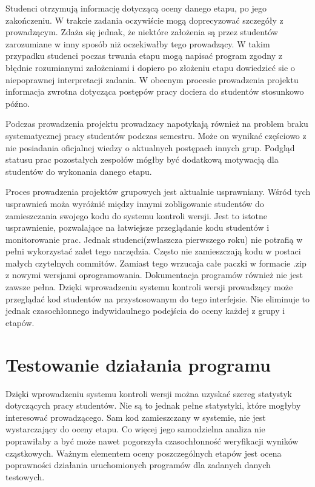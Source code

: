 Studenci otrzymują informację dotyczącą oceny danego etapu, po jego zakończeniu.
W trakcie zadania oczywiście mogą doprecyzować szczegóły z prowadzącym.
Zdaża się jednak, że niektóre założenia są przez studentów zarozumiane w inny sposób niż oczekiwałby tego prowadzący.
W takim przypadku studenci poczas trwania etapu mogą napisać program zgodny z błędnie rozumianymi założeniami i dopiero po złożeniu etapu dowiedzieć sie o niepoprawnej interpretacji zadania.
W obecnym procesie prowadzenia projektu informacja zwrotna dotycząca postępów pracy dociera do studentów stosunkowo późno.

Podczas prowadzenia projektu prowadzacy napotykają również na problem braku systematycznej pracy studentów podczas semestru.
Może on wynikać częściowo z nie posiadania oficjalnej wiedzy o aktualnych postępach innych grup.
Podgląd statusu prac pozostałych zespołów mógłby być dodatkową motywacją dla studentów do wykonania danego etapu.

Proces prowadzenia projektów grupowych jest aktualnie usprawniany. 
Wśród tych usprawnień moża wyróżnić między innymi zobligowanie studentów do zamieszczania
swojego kodu do systemu kontroli wersji. 
Jest to istotne usprawnienie, pozwalające na łatwiejsze przeglądanie kodu studentów i monitorowanie prac. 
Jednak studenci(zwłaszcza pierwszego roku) nie potrafią w pełni wykorzystać zalet tego narzędzia. 
Często nie zamieszczają kodu w postaci małych czytelnych commitów.
Zamiast tego wrzucaja całe paczki w formacie .zip z nowymi wersjami oprogramowania.
Dokumentacja programów również nie jest zawsze pełna.
Dzięki wprowadzeniu systemu kontroli wersji prowadzący może przeglądać kod studentów na przystosowanym do tego interfejsie. 
Nie eliminuje to jednak czasochłonnego indywidaulnego podejścia do oceny każdej z grupy i etapów.




\section{Testowanie działania programu}
\label{programs-testing}

Dzięki wprowadzeniu systemu kontroli wersji można uzyskać szereg statystyk dotyczących pracy studentów.
Nie są to jednak pełne statystyki, które mogłyby interesować prowadzącego.
Sam kod zamieszczany w systemie, nie jest wystarczający do oceny etapu.
Co więcej jego samodzielna analiza nie poprawiłaby a być może nawet pogorszyła czasochłonność weryfikacji wyników cząstkowych.
Ważnym elementem oceny poszczególnych etapów jest ocena poprawności działania uruchomionych programów dla zadanych danych testowych.

